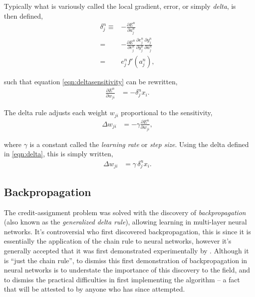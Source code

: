 \documentclass[thesis]{subfiles}
\begin{document}
Typically what is variously called the local gradient, error, or simply \emph{delta}, is then defined,
\begin{equation}
\label{eqn:delta}
\begin{aligned}
    \delta^n_j \equiv&-\frac{\partial E^n}{\partial a^n_j}\\
    =& -\frac{\partial E^n}{\partial e^n_j}\frac{\partial e^n_j}{\partial y^n_j} \frac{\partial y^n_j}{\partial a^n_j}\\
    =& e^n_j  f'\left( a^n_j \right),
\end{aligned}
\end{equation}

such that equation \ref{eqn:deltasensitivity} can be rewritten,
\begin{equation}
\begin{aligned}
    \frac{\partial E^n}{\partial w_{ji}} &= -\delta^n_j x_i.
\end{aligned}
\end{equation}


The delta rule adjusts each weight $w_{ji}$ proportional to the sensitivity, 
\begin{equation}
\begin{aligned}
    \Delta w_{ji} &= -\gamma \frac{\partial E^n}{\partial w_{ji}},
\end{aligned}
\end{equation}

where $\gamma$ is a constant called the \emph{learning rate} or \emph{step size}. Using the delta defined in \ref{eqn:delta}, this is simply written,
\begin{equation}
\begin{aligned}
    \Delta w_{ji} &= \gamma\, \delta^n_j x_i.
\end{aligned}
\end{equation}


\subsection{Backpropagation}
The credit-assignment problem was solved with the discovery of \emph{backpropagation} (also known as the \emph{generalized delta rule}), allowing learning in multi-layer neural networks. It's controversial who first discovered backpropagation, this is since it is essentially the application of the chain rule to neural networks, however it's generally accepted that it was first demonstrated experimentally by \citet{rumelhartbackprop}. Although it is ``just the chain rule'', to dismiss this first demonstration of backpropagation in neural networks is to understate the importance of this discovery to the field, and to dismiss the practical difficulties in first implementing the algorithm -- a fact that will be attested to by anyone who has since attempted.
\end{document}
